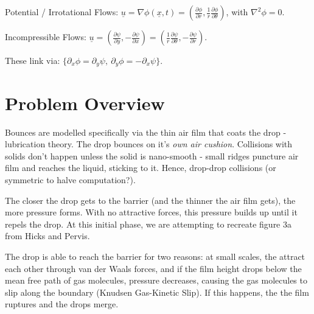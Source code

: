 \documentclass[11pt,a4paper]{article}
\begin{document}
	Potential / Irrotational Flows: $\underline{u} = \nabla \phi(\underline{x},t) = \left( \frac{\partial \phi}{\partial r}, \frac{1}{r}\frac{\partial \phi}{\partial \theta} \right)$, with $\nabla ^2\phi = 0$.
	
	Incompressible Flows: $\underline{u} = \left( \frac{\partial \psi}{\partial y}, -\frac{\partial \psi}{\partial x} \right) = \left( \frac{1}{r}\frac{\partial \psi}{\partial \theta}, -\frac{\partial \psi}{\partial r} \right)$.
	
	These link via: $\{\partial _x\phi = \partial _y\psi,\ \partial _y\phi = -\partial _x\psi\}$.
	
	
	
	
	
	\section{Problem Overview}
	Bounces are modelled specifically via the thin air film that coats the drop - lubrication theory. The drop bounces on it's \textit{own air cushion}.
	Collisions with solids don't happen unless the solid is nano-smooth - small ridges puncture air film and reaches the liquid, sticking to it. Hence, drop-drop collisions (or symmetric to halve computation?).
	
	The closer the drop gets to the barrier (and the thinner the air film gets), the more pressure forms. With no attractive forces, this pressure builds up until it repels the drop. At this initial phase, we are attempting to recreate figure 3a from Hicks and Pervis.
	
	
	The drop is able to reach the barrier for two reasons: at small scales, the attract each other through van der Waals forces, and if the film height drops below the mean free path of gas molecules, pressure decreases, causing the gas molecules to slip along the boundary (Knudsen Gas-Kinetic Slip). If this happens, the the film ruptures and the drops merge.
	
	
\end{document}

